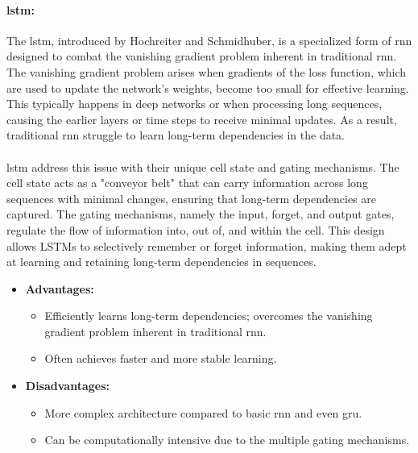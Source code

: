         \paragraph{\acrfull{lstm}\cite{hochreiter_long_1997}:}The \acrshort{lstm}, introduced by Hochreiter and Schmidhuber, is a specialized form of \acrshort{rnn} designed to combat the vanishing gradient problem inherent in traditional \acrshort{rnn}. The vanishing gradient problem arises when gradients of the loss function, which are used to update the network's weights, become too small for effective learning. This typically happens in deep networks or when processing long sequences, causing the earlier layers or time steps to receive minimal updates. As a result, traditional \acrshort{rnn} struggle to learn long-term dependencies in the data.

        \paragraph{}\acrshort{lstm} address this issue with their unique cell state and gating mechanisms. The cell state acts as a "conveyor belt" that can carry information across long sequences with minimal changes, ensuring that long-term dependencies are captured. The gating mechanisms, namely the input, forget, and output gates, regulate the flow of information into, out of, and within the cell. This design allows LSTMs to selectively remember or forget information, making them adept at learning and retaining long-term dependencies in sequences.

        \begin{itemize}
            \item \textbf{Advantages:}
            \begin{itemize}
                \item Efficiently learns long-term dependencies; overcomes the vanishing gradient problem inherent in traditional \acrshort{rnn}.
                \item Often achieves faster and more stable learning.
            \end{itemize}
            \item \textbf{Disadvantages:}
            \begin{itemize}
                \item More complex architecture compared to basic \acrshort{rnn} and even \acrshort{gru}.
                \item Can be computationally intensive due to the multiple gating mechanisms.
            \end{itemize}
        \end{itemize}

